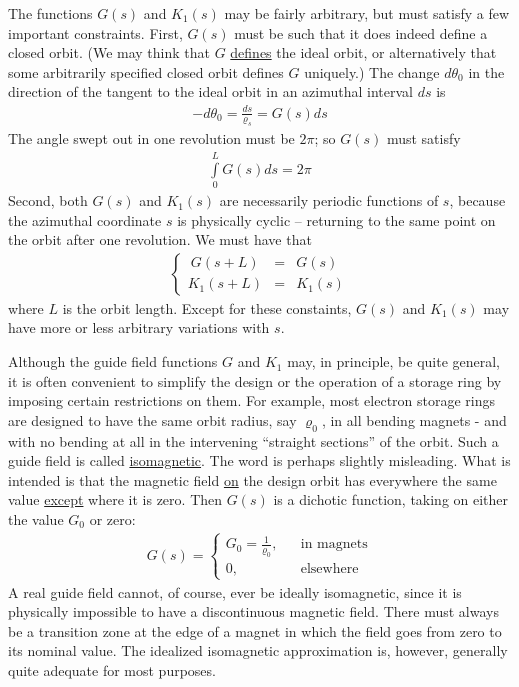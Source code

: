 The functions $G(s)$ and $K_1(s)$ may be fairly arbitrary, but must satisfy a few important constraints. First, $G(s)$ must be such that it does indeed define a closed orbit. (We may think that $G$ \underline{defines} the ideal orbit, or alternatively that some arbitrarily specified closed orbit defines $G$ uniquely.) The change $d\theta_0$ in the direction of the tangent to the ideal orbit in an azimuthal interval $ds$ is
\begin{align}
	-d\theta_0 = \frac{ds}{\varrho_s} = G(s)ds
\end{align}
The angle swept out in one revolution must be $2\pi$; so $G(s)$ must satisfy
\begin{align}
	\int\limits_{0}^{L} G(s)ds = 2\pi
\end{align}
Second, both $G(s)$ and $K_1(s)$ are necessarily periodic functions of $s$, because the azimuthal coordinate $s$ is physically cyclic -- returning to the same point on the orbit after one revolution. We must have that
\begin{align}
	\left\{\begin{array}{rcl}
	\ G(s+L) & = & G(s)\\
	K_1(s+L) & = & K_1(s)
	\end{array}\right.
\end{align}
where $L$ is the orbit length. Except for these constaints, $G(s)$ and $K_1(s)$ may have more or less arbitrary variations with $s$.

Although the guide field functions $G$ and $K_1$ may, in principle, be quite general, it is often convenient to simplify the design or the operation of a storage ring by imposing certain restrictions on them. For example, most electron storage rings are designed to have the same orbit radius, say $\varrho_0$, in all bending magnets - and with no bending at all in the intervening “straight sections” of the orbit. Such a guide field is called \underline{isomagnetic}. The word is perhaps slightly misleading. What is intended is that the magnetic field \underline{on} the design orbit has everywhere the same value \underline{except} where it is zero. Then $G(s)$ is a dichotic function, taking on either the value $G_0$ or zero:
\begin{align}\label{eq:2.9}
	G(s) = \left\{\begin{array}{rrrr}
	G_0 = \frac{1}{\varrho_0}, &&  \text{in magnets}\\
	0, && \text{elsewhere}
	\end{array}\right.
\end{align}
A real guide field cannot, of course, ever be ideally isomagnetic, since it is physically impossible to have a discontinuous magnetic field. There must always be a transition zone at the edge of a magnet in which the field goes from zero to its nominal value. The idealized isomagnetic approximation is, however, generally quite adequate for most purposes.

